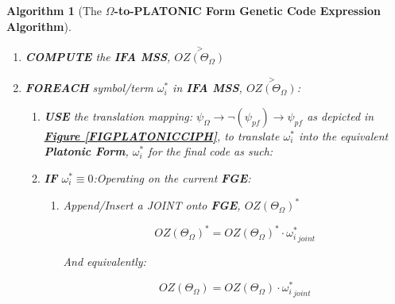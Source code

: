 \documentclass[a4paper, 18pt]{book} %
\newtheorem{alg}{Algorithm}
\begin{document}
\begin{appendices}
\begin{alg}[The \textbf{$\Omega$-to-PLATONIC Form Genetic Code Expression Algorithm}]
\begin{enumerate}
{\begin{enumerate}
{\begin{equation}
\label{EQSTARTFGE_ORIG}
\boxed{OZ(\Theta_\Omega)}^* = \langle \langle OZ(\Theta_\Omega) \rangle \langle \rangle \rangle
\end{equation}\\

This ensures, we have the prefix affix, \textbf{IFA}, as the contents of the sequence start of \textbf{FGE} \textit{extended} by a \textbf{still empty subsequence} --- in expression form, this shall merely be a backbone structure with \textbf{IFA} as its head, and a terminal that is ready to have more units appended to it, \textbf{after a single GAP/JOINT extension to IFA}. So, it also means, at this juncture, \textbf{PFA} is just:\\

\begin{equation}
\label{EQSTARTFGESUF_ORIG}
\boxed{OZ(\Theta_\Omega)} = \langle \rangle
\end{equation}\\

}
\item {
	\textbf{COMPUTE} the \textbf{IFA MSS}, $\overset{>}{OZ(\Theta_\Omega)}$
}
\item{\textbf{FOREACH} symbol/term $\omega_i^*$ in \textbf{IFA MSS}, $\overset{>}{OZ(\Theta_\Omega)}$: 
\begin{enumerate}
    \item{\textbf{USE} the translation mapping: $\psi_\Omega \rightarrow \lnot(\psi_{pf}) \rightarrow \psi_{pf}$ as depicted in \textbf{\hyperref[FIGPLATONICCIPH]{Figure \ref{FIGPLATONICCIPH}}}, to translate $\omega_i^*$ into the equivalent \textbf{Platonic Form}, $\boxed{\omega_i^*}$ for the final code as such:}
\item { \textbf{IF} $\omega_i^* \equiv 0$:Operating on the current \textbf{FGE}: 
		\begin{enumerate}
		\item { Append/Insert a JOINT onto \textbf{FGE},  $\boxed{OZ(\Theta_\Omega)}^*$

		\begin{equation}
		\label{EQEXTFGEJOINT_ORIG}
		\boxed{OZ(\Theta_\Omega)}^* = \boxed{OZ(\Theta_\Omega)}^* \cdot \boxed{\omega_i^*}_{joint}
		\end{equation}		
		
		And equivalently:
		
		\begin{equation}
		\label{EQEXTFGEJOINTSUF_ORIG}
		\boxed{OZ(\Theta_\Omega)} = \boxed{OZ(\Theta_\Omega)} \cdot \boxed{\omega_i^*}_{joint}
		\end{equation}				
		
}
\end{enumerate}}
\end{enumerate}}
\end{enumerate}}
\end{enumerate}
\end{alg}
\end{appendices}
\end{document}
